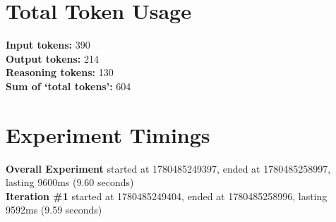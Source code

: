 \documentclass{article}
\begin{document}
\section*{Total Token Usage}
\textbf{Input tokens: }390
\\\textbf{Output tokens: }214
\\\textbf{Reasoning tokens: }130
\\\textbf{Sum of `total tokens': }604
\section*{Experiment Timings}
\textbf{Overall Experiment} started at 1780485249397, ended at 1780485258997, lasting 9600ms (9.60 seconds)
\\\textbf{Iteration \#1} started at 1780485249404, ended at 1780485258996, lasting 9592ms (9.59 seconds)
\end{document}
